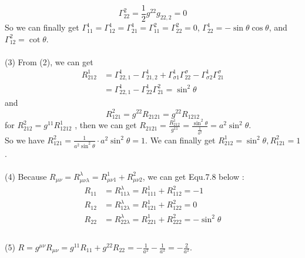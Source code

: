\documentclass[12pt]{article}
\begin{document}
\begin{equation}
\displaystyle 
\Gamma^{2}_{22} = \frac{1}{2}g^{22}g_{22,2}=0 
	\tag{7.5}
\end{equation}
So we can finally get $\Gamma^{1}_{11}=\Gamma^{1}_{12}=\Gamma^{1}_{21}=\Gamma^{2}_{11}=\Gamma^{2}_{22}=0$, $\Gamma^{1}_{22}=-\sin\theta\cos\theta$, and $\Gamma^{2}_{12}=\cot\theta$.\\
~\\
(3) From (2), we can get
\begin{equation}
\begin{aligned}
\displaystyle 
R^{1}_{212} &= \Gamma^{1}_{22,1}- \Gamma^{1}_{21,2}+\Gamma^{1}_{\sigma1}\Gamma^{\sigma}_{22}-\Gamma^{1}_{\sigma2}\Gamma^{\sigma}_{21}\\
&= \Gamma^{1}_{22,1}-\Gamma^{1}_{22}\Gamma^{2}_{21}=\sin^{2}\theta
\end{aligned}
	\tag{7.6}
\end{equation}
and
\begin{equation}
\displaystyle 
R^{2}_{121} = g^{22}R_{2121} = g^{22}R_{1212}
	\tag{7.7}
\end{equation}
for $R^{2}_{212}=g^{11}R^{1}_{1212}$ , then we can get $\displaystyle R_{2121} = \frac{R^{1}_{212}}{g^{11}} = \frac{\sin^{2}\theta}{\frac{1}{a^{2}}}=a^{2}\sin^{2}\theta$.\\
So we have $\displaystyle R^{2}_{121} = \frac{1}{a^{2}\sin^{2}\theta} \cdot a^{2}\sin^{2}\theta=1$. We can finally get $R^{1}_{212} = \sin^{2}\theta, R^{2}_{121} = 1$.\\
~\\
(4) Because $R_{\mu\nu}=R^{\lambda}_{\mu\nu\lambda}=R^{1}_{\mu\nu1}+R^{2}_{\mu\nu2}$, we can get Equ.7.8 below :\\
\begin{equation}
\begin{aligned}
\displaystyle 
R_{11} &= R^{\lambda}_{11\lambda} = R^{1}_{111}+R^{2}_{112} = -1\\
R_{12} &= R^{\lambda}_{12\lambda} = R^{1}_{121}+R^{2}_{122} = 0\\
R_{22} &= R^{\lambda}_{22\lambda} = R^{1}_{221}+R^{2}_{222} = -\sin^{2}\theta\\
\end{aligned}
	\tag{7.8}
\end{equation}
~\\
(5) $\displaystyle R=g^{\mu\nu}R_{\mu\nu}=g^{11}R_{11}+g^{22}R_{22}=-\frac{1}{a^{2}}-\frac{1}{a^{2}}=-\frac{2}{a^{2}}$.\\
~\\
\end{document}
